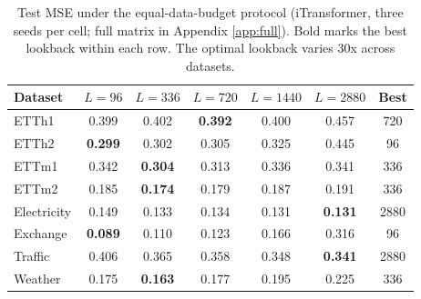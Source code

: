 \begin{table}[t]
\caption{Test MSE under the equal-data-budget protocol (iTransformer, three seeds per cell; full matrix in Appendix \ref{app:full}). Bold marks the best lookback within each row. The optimal lookback varies 30x across datasets.}
\label{tab:main}
\centering\scriptsize
\begin{tabular}{lcccccc}
\toprule
Dataset & $L{=}96$ & $L{=}336$ & $L{=}720$ & $L{=}1440$ & $L{=}2880$ & Best \\
\midrule
ETTh1 & 0.399 & 0.402 & \textbf{0.392} & 0.400 & 0.457 & 720 \\
ETTh2 & \textbf{0.299} & 0.302 & 0.305 & 0.325 & 0.445 & 96 \\
ETTm1 & 0.342 & \textbf{0.304} & 0.313 & 0.336 & 0.341 & 336 \\
ETTm2 & 0.185 & \textbf{0.174} & 0.179 & 0.187 & 0.191 & 336 \\
Electricity & 0.149 & 0.133 & 0.134 & 0.131 & \textbf{0.131} & 2880 \\
Exchange & \textbf{0.089} & 0.110 & 0.123 & 0.166 & 0.316 & 96 \\
Traffic & 0.406 & 0.365 & 0.358 & 0.348 & \textbf{0.341} & 2880 \\
Weather & 0.175 & \textbf{0.163} & 0.177 & 0.195 & 0.225 & 336 \\
\bottomrule
\end{tabular}
\end{table}

